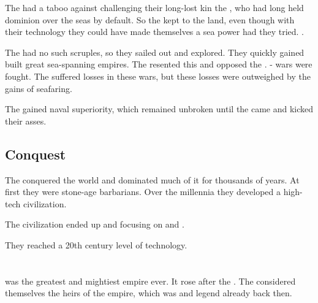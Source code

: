 The \quiljaaran{} had a taboo against challenging their long-lost kin the \nagae{}, who had long held dominion over the seas by default. 
So the \quiljaaran{} kept to the land, even though with their technology they could have made themselves a sea power had they tried. 
. 

The \aryothim{} had no such scruples, so they sailed out and explored. 
They quickly gained built great sea-spanning empires. 
The \nagae{} resented this and opposed the \aryothim. 
\Naga-\aryoth{} wars were fought. 
The \aryothim{} suffered losses in these wars, but these losses were outweighed by the gains of seafaring. 

The \aryothim{} gained naval superiority, which remained unbroken until the \dzraicchenosses{} came and kicked their asses. 









\subsection{Conquest}
The \aryothim conquered the world and dominated much of it for thousands of years.
At first they were stone-age barbarians.
Over the millennia they developed a high-tech civilization.

The \aryoth civilization ended up  and focusing on  and . 

They reached a 20th century level of technology.















\section{\Saphyrae}
\index{\Saphyrae}
\Saphyrae{} was the greatest and mightiest \quiljaaran{} empire ever. 
It rose after the \firstbanewar. 
The \Saphyraeans{} considered themselves the heirs of the \ophidian{} empire, which was  and legend already back then. 

